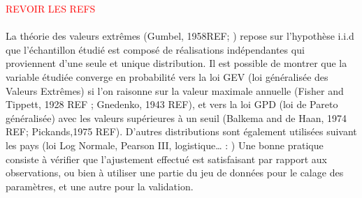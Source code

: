 \documentclass[11pt]{article}
\begin{document}
	\textcolor{red}{REVOIR LES REFS}
	\paragraph{} La théorie des valeurs extrêmes (Gumbel, 1958REF; \cite{coles_classical_2001}) repose sur l'hypothèse i.i.d que l'échantillon étudié est composé de réalisations indépendantes qui proviennent d'une seule et unique distribution. Il est possible de montrer que la variable étudiée converge en probabilité vers la loi GEV (loi généralisée des Valeurs Extrêmes) si l'on raisonne sur la valeur maximale annuelle (Fisher and Tippett, 1928 REF ; Gnedenko, 1943 REF), et vers la loi GPD (loi de Pareto généralisée) avec les valeurs supérieures à un seuil (Balkema and de Haan, 1974 REF; Pickands,1975 REF). D’autres distributions sont également utilisées suivant les pays (loi Log Normale, Pearson III, logistique… : \cite{whs_flood_2008}) Une bonne pratique consiste à vérifier que l'ajustement effectué est satisfaisant par rapport aux observations, ou bien à utiliser une partie du jeu de données pour le calage des paramètres, et une autre pour la validation.
	
\end{document}
